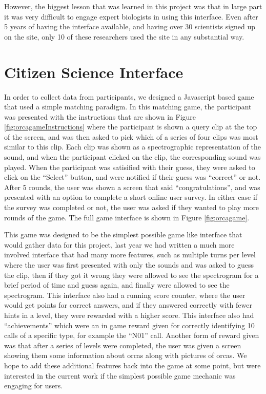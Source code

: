 \documentclass[12pt,oneside]{book}
\begin{document}
However, the biggest lesson that was learned in this project was that
in large part it was very difficult to engage expert biologists in
using this interface.  Even after 5 years of having the interface
available, and having over 30 scientists signed up on the site, only
10 of these researchers used the site in any substantial way.  


%
%


\section{Citizen Science Interface}

In order to collect data from participants, we designed a Javascript
based game that used a simple matching paradigm. In this matching
game, the participant was presented with the instructions that are
shown in Figure \ref{fig:orcagameInstructions} where the participant
is shown a query clip at the top of the screen, and was then asked to
pick which of a series of four clips was most similar to this clip.
Each clip was shown as a spectrographic representation of the sound,
and when the participant clicked on the clip, the corresponding sound
was played.  When the participant was satisified with their guess,
they were asked to click on the ``Select'' button, and were notified
if their guess was ``correct'' or not.  After 5 rounds, the user was
shown a screen that said ``congratulations'', and was presented with
an option to complete a short online user survey.  In either case if
the survey was completed or not, the user was asked if they wanted to
play more rounds of the game.  The full game interface is shown in
Figure \ref{fig:orcagame}.  

This game was designed to be the simplest possible game like interface
that would gather data for this project, last year we had written a
much more involved interface that had many more features, such as
multiple turns per level where the user was first presented with only
the sounds and was asked to guess the clip, then if they got it wrong
they were allowed to see the spectrogram for a brief period of time
and guess again, and finally were allowed to see the spectrogram.
This interface also had a running score counter, where the user would
get points for correct answers, and if they answered correctly with
fewer hints in a level, they were rewarded with a higher score.  This
interface also had ``achievements'' which were an in game reward given
for correctly identifying 10 calls of a specific type, for example the
``N01'' call.  Another form of reward given was that after a series of
levels were completed, the user was given a screen showing them some
information about orcas along with pictures of orcas.  We hope to add
these additional features back into the game at some point, but were
interested in the current work if the simplest possible game mechanic
was engaging for users.
\end{document}
